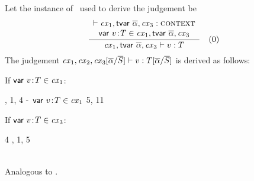 \begin{bycase}
\Case{\Revar}\\
Let the instance of \Revar\ used to derive the judgement be
\[
\frac{\begin{array}{c}\vdash\mathit{cx}_1,\mathsf{tvar}\ \overline{\alpha},\mathit{cx}_3:\textsc{context}\\\mathsf{var}\ v\!:\!T\in\mathit{cx}_1,\mathsf{tvar}\ \overline{\alpha},\mathit{cx}_3\end{array}}{\mathit{cx}_1,\mathsf{tvar}\ \overline{\alpha},\mathit{cx}_3\vdash v:T}\quad\mbox{(0)}
\]
The judgement
$\mathit{cx}_1,\mathit{cx}_2,\mathit{cx}_3[\overline{\alpha}/\overline{S}]\vdash v:T[\overline{\alpha}/\overline{S}]$
is derived as follows:
\begin{derivation}
\end{derivation}
If $\mathsf{var}\ v\!:\!T\in\mathit{cx}_1$:
\begin{derivatioN}{3}
     {\Revar, 1, 4}
     {\hyp\ $\mathsf{var}\ v\!:\!T\in\mathit{cx}_1$}
     {5, 11}
\end{derivatioN}
If $\mathsf{var}\ v\!:\!T\in\mathit{cx}_3$:
\begin{derivatioN}{3}
     {4}
     {\Revar, 1, 5}
\end{derivatioN}

\Case{\Reop, \Rthax}\\
Analogous to \Rtedef.


\end{bycase}
